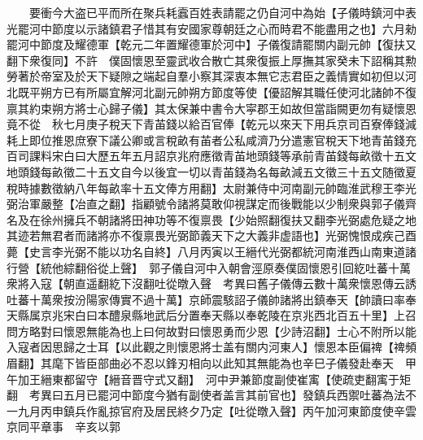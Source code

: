 　　要衝今大盗已平而所在聚兵耗蠧百姓表請罷之仍自河中為始【子儀時鎮河中表光罷河中節度以示諸鎮君子惜其有安國家尊朝廷之心而時君不能盡用之也】六月勑罷河中節度及耀德軍【乾元二年置耀德軍於河中】子儀復請罷關内副元帥【復扶又翻下衆復同】不許　僕固懷恩至靈武收合散亡其衆復振上厚撫其家癸未下詔稱其勲勞著於帝室及於天下疑隙之端起自羣小察其深衷本無它志君臣之義情實如初但以河北既平朔方已有所屬宜解河北副元帥朔方節度等使【優詔解其職任使河北諸帥不復禀其約束朔方將士心歸子儀】其太保兼中書令大寜郡王如故但當詣闕更勿有疑懷恩竟不從　秋七月庚子稅天下青苖錢以給百官俸【乾元以來天下用兵京司百寮俸錢減耗上即位推恩庶寮下議公卿或言稅畝有苖者公私咸濟乃分遣憲官稅天下地青苖錢充百司課料宋白曰大歷五年五月詔京兆府應徵青苖地頭錢等承前青苖錢每畝徵十五文地頭錢每畝徵二十五文自今以後宜一切以青苖錢為名每畝減五文徵三十五文随徵夏稅時據數徵納八年每畝率十五文俸方用翻】太尉兼侍中河南副元帥臨淮武穆王李光弼治軍嚴整【冶直之翻】指顧號令諸將莫敢仰視謀定而後戰能以少制衆與郭子儀齊名及在徐州擁兵不朝諸將田神功等不復禀畏【少始照翻復扶又翻李光弼處危疑之地其迹若無君者而諸將亦不復禀畏光弼節義天下之大義非虚語也】光弼愧恨成疾己酉薨【史言李光弼不能以功名自終】八月丙寅以王縉代光弼都統河南淮西山南東道諸行營【統他綜翻俗從上聲】　郭子儀自河中入朝會涇原奏僕固懷恩引回紇吐蕃十萬衆將入寇【朝直遥翻紇下沒翻吐從暾入聲　考異曰舊子儀傳云數十萬衆懷恩傳云誘吐蕃十萬衆按汾陽家傳實不過十萬】京師震駭詔子儀帥諸將出鎮奉天【帥讀曰率奉天縣属京兆宋白曰本醴泉縣地武后分置奉天縣以奉乾陵在京兆西北百五十里】上召問方略對曰懷恩無能為也上曰何故對曰懷恩勇而少恩【少詩沼翻】士心不附所以能入寇者因思歸之士耳【以此觀之則懷恩將士盖有關内河東人】懷恩本臣偏禆【禆頻眉翻】其麾下皆臣部曲必不忍以鋒刃相向以此知其無能為也辛巳子儀發赴奉天　甲午加王縉東都留守【縉音晋守式又翻】　河中尹兼節度副使崔㝢【使疏吏翻㝢于矩翻　考異曰五月已罷河中節度今猶有副使者盖言其前官也】發鎮兵西禦吐蕃為法不一九月丙申鎮兵作亂掠官府及居民終夕乃定【吐從暾入聲】丙午加河東節度使辛雲京同平章事　辛亥以郭

